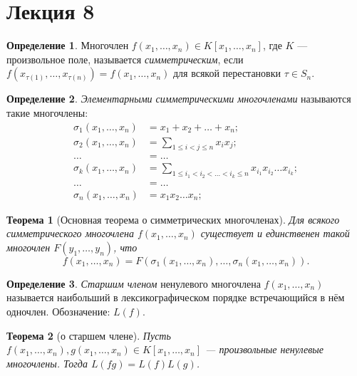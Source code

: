 \documentclass[a4paper]{article}
\theoremstyle{plain}
\newtheorem*{theorem}{Теорема}
\theoremstyle{definition}
\newtheorem{definition}{Определение}
\numberwithin{definition}{section}
\numberwithin{proposal}{section}
\begin{document}
\section{Лекция 8}

\begin{definition}
Многочлен \(f(x_1, \dots, x_n) \in K[x_1, \dots, x_n]\), где \(K\) --- произвольное поле, называется \emph{симметрическим}, если \(f(x_{\tau(1)}, \dots, x_{\tau(n)}) = f(x_1, \dots, x_n)\) для всякой перестановки \(\tau \in S_n\).
\end{definition}

\begin{definition}
\emph{Элементарными симметрическими многочленами} называются такие многочлены:
\begin{align*}
	\sigma_1(x_1, \dots, x_n) &= x_1 + x_2 + \dots + x_n; \\
	\sigma_2(x_1, \dots, x_n) &= \sum_{1 \leqslant i < j \leqslant n} x_ix_j; \\
	\dots &= \dots \\
	\sigma_k(x_1, \dots, x_n) &= \sum_{1 \leqslant i_1 < i_2 < \dots < i_k \leqslant n} x_{i_1}x_{i_2}\dots{}x_{i_k}; \\
	\dots &= \dots \\
	\sigma_n(x_1, \dots, x_n) &= x_1x_2\dots{}x_n;
\end{align*} 
\end{definition}

\begin{theorem}[Основная теорема о симметрических многочленах]
Для всякого симметрического многочлена \(f(x_1, \dots, x_n)\) существует и единственен такой многочлен \(F(y_1, \dots, y_n)\), что
\begin{equation*}
	f(x_1, \dots, x_n) = F(\sigma_1(x_1, \dots, x_n), \dots, \sigma_n(x_1, \dots, x_n)).
\end{equation*}
\end{theorem}

\begin{definition}
\emph{Старшим членом} ненулевого многочлена \(f(x_1, \dots, x_n)\) называется наибольший в лексикографическом порядке встречающийся в нём одночлен. Обозначение: \(L(f)\).
\end{definition}

\begin{theorem}[о старшем члене]
Пусть \(f(x_1, \dots, x_n), g(x_1, \dots, x_n) \in K[x_1, \dots, x_n]\) --- произвольные ненулевые многочлены. Тогда \(L(fg) = L(f)L(g)\).
\end{theorem}
\end{document}
